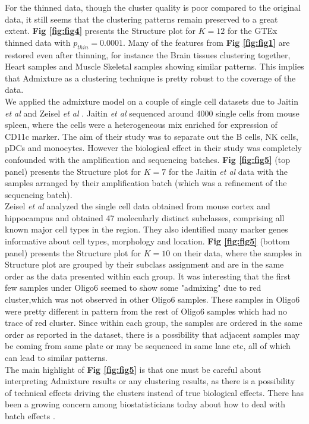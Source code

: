 For the thinned data, though the cluster quality is poor compared to the original data, it still seems that the clustering patterns remain preserved to a great extent. \textbf{Fig \ref{fig:fig4}} presents the Structure plot for $K=12$ for the GTEx thinned data with $p_{thin}=0.0001$. Many of the features from \textbf{Fig \ref{fig:fig1}} are restored even after thinning, for instance the Brain tissues clustering together, Heart samples and Muscle Skeletal samples showing similar patterns. This implies that Admixture as a clustering technique is pretty robust to the coverage of the data. \\[1 pt]

We applied the admixture model on a couple of single cell datasets due to Jaitin \textit{et al} \cite{Jaitin2014} and Zeisel \textit{et al} \cite{Zeisel2015}.  Jaitin \textit{et al} sequenced around $4000$ single cells from mouse spleen, where the cells were a heterogeneous mix enriched for expression of CD11c marker.  The aim of their study was to separate out the B cells, NK cells, pDCs and monocytes.  However the biological effect in their study was completely confounded with the amplification and sequencing batches.  \textbf{Fig \ref{fig:fig5}} (top panel) presents the Structure plot  for $K=7$ for the Jaitin \textit{et al} data with the samples arranged by their amplification batch (which was a refinement of the sequencing batch). \\[1 pt]

Zeisel \textit{et al} analyzed the single cell data obtained from mouse cortex and hippocampus and obtained 47 molecularly distinct subclasses, comprising all known major cell types in the region. They also identified many marker genes informative about cell types, morphology and location.  \textbf{Fig \ref{fig:fig5}} (bottom panel) presents the Structure plot for  $K=10$ on their data, where the samples in Structure plot are grouped by their subclass assignment and are in the same order as the data presented within each group. It was interesting that the first few samples under Oligo6 seemed to show some "admixing" due to red cluster,which was not observed in other Oligo6 samples. These samples in Oligo6 were pretty different in pattern from the rest of Oligo6 samples which had no trace of red cluster. Since within each group, the samples are ordered in the same order as reported in the dataset, there is a possibility that adjacent samples may be coming from same plate or may be sequenced in same lane etc, all of which can lead to similar patterns. \\[1 pt]
The main highlight of \textbf{Fig \ref{fig:fig5}} is that one must be careful about interpreting Admixture results or any clustering results, as there is a possibility of technical effects driving the clusters instead of true biological effects. There has been a growing concern among biostatisticians today about how to deal with batch effects \cite{Leek2010} \cite{Hicks2015}. 



